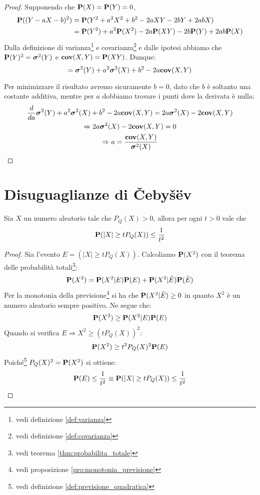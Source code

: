 \begin{proof}
  Supponendo che \( \mathbf{P}(X) = \mathbf{P}(Y) = 0 \),
  \begin{align*}
    \mathbf{P}((Y - aX - b)^2) &= \mathbf{P}(Y^2 + a^2 X^2 + b^2 - 2aXY - 2bY + 2abX) \\
    &= \mathbf{P}(Y^2) + a^2\mathbf{P}(X^2) - 2a\mathbf{P}(XY) - 2b\mathbf{P}(Y) + 2ab\mathbf{P}(X)
  \end{align*}
  Dalla definizione di varianza\footnote{vedi definizione \ref{def:varianza}} e covarianza\footnote{vedi definizione \ref{def:covarianza}} e dalle ipotesi abbiamo che \( \mathbf{P}(Y)^2 = \boldsymbol\sigma^2(Y) \) e \( \mathbf{cov}(X,Y) = \mathbf{P}(XY) \).
  Dunque:
  \[ = \boldsymbol\sigma^2(Y) + a^2 \boldsymbol\sigma^2(X) + b^2 -2a \mathbf{cov}(X,Y) \] %

  Per minimizzare il risultato avremo sicuramente \( b = 0 \), dato che $b$ è soltanto una costante additiva, mentre per $a$ dobbiamo trovare i punti dove la derivata è nulla:
  \begin{gather*}
    \frac{d}{da} \boldsymbol\sigma^2(Y) + a^2 \boldsymbol\sigma^2(X) + b^2 -2a \mathbf{cov}(X,Y) = 2a\boldsymbol\sigma^2(X) - 2 \mathbf{cov}(X,Y) \\
    \Rightarrow 2a\boldsymbol\sigma^2(X) - 2 \mathbf{cov}(X,Y) = 0\\
    \Rightarrow a = \frac{\mathbf{cov}(X,Y)}{\boldsymbol\sigma^2(X)}
  \end{gather*}

\end{proof}


\section{Disuguaglianze di Čebyšëv} %
\begin{definition}\label{def:chebyshev1}
  Sia $X$ un numero aleatorio tale che \( P_Q(X) > 0 \), allora per ogni \( t > 0 \) vale che
  \[ \mathbf{P}(|X| \ge t P_Q(X)) \le \frac{1}{t^2} \]
\end{definition}

\begin{proof}
  Sia l'evento \( E = (|X| \ge t P_Q(X)) \). Calcoliamo \( \mathbf{P}(X^2) \) con il teorema delle probabilità totali\footnote{vedi teorema \ref{thm:probabilita_totale}}:
  \[ \mathbf{P}(X^2) = \mathbf{P}(X^2|E)\mathbf{P}(E) + \mathbf{P}(X^2|\tilde{E})\mathbf{P}(\tilde{E}) \] %
  Per la monotonia della previsione\footnote{vedi proposizione \ref{pro:monotonia_previsione}} si ha che \( \mathbf{P}(X^2|\tilde{E}) \ge 0 \) in quanto \( X^2 \) è un numero aleatorio sempre positivo.
  Ne segue che:
  \[ \mathbf{P}(X^2) \ge \mathbf{P}(X^2|E)\mathbf{P}(E) \]
  Quando si verifica  \( E \Rightarrow X^2 \ge (t P_Q(X))^2 \):
  \[ \mathbf{P}(X^2) \ge t^2 P_Q(X)^2 \mathbf{P}(E) \]
  Poiché\footnote{vedi definizione \ref{def:previsione_quadratica}} \( P_Q(X)^2 = \mathbf{P}(X^2) \) si ottiene:
  \[ \mathbf{P}(E) \le \frac{1}{t^2} \equiv \mathbf{P}(|X| \ge t P_Q(X)) \le \frac{1}{t^2} \]
\end{proof}

